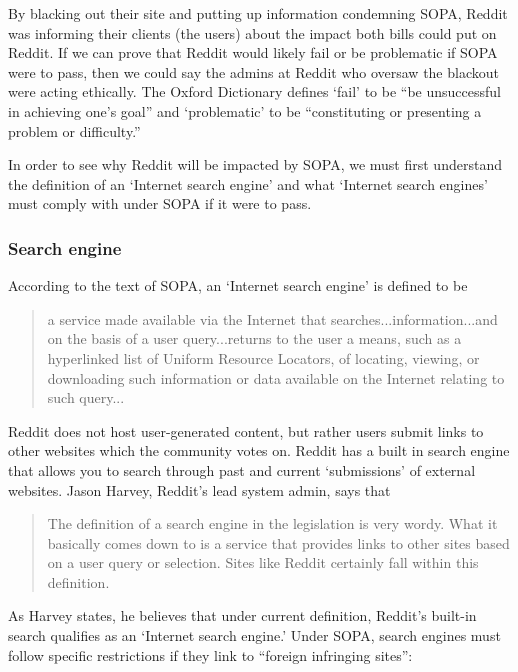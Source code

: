 \documentclass[11pt]{article}
\begin{document}
\begin{multicols}{2}
By blacking out their site and putting up information condemning SOPA, Reddit was informing their clients (the users) about the impact both bills could put on Reddit. If we can prove that Reddit would likely fail or be problematic if SOPA were to pass, then we could say the admins at Reddit who oversaw the blackout were acting ethically. The Oxford Dictionary defines `fail' to be ``be unsuccessful in achieving one’s goal'' and `problematic' to be ``constituting or presenting a problem or difficulty.''\cite{def-fail}\cite{def-problematic}

In order to see why Reddit will be impacted by SOPA, we must first understand the definition of an `Internet search engine' and what `Internet search engines' must comply with under SOPA if it were to pass.

   \subsubsection{Search engine}

According to the text of SOPA, an `Internet search engine' is defined to be

\begin{quote}a service made available via the Internet that searches...information...and on the basis of a user query...returns to the user a means, such as a hyperlinked list of Uniform Resource Locators, of locating, viewing, or downloading such information or data available on the Internet relating to such query...\cite[101.16]{sopa}\end{quote}

Reddit does not host user-generated content, but rather users submit links to other websites which the community votes on.\cite{reddit-help-voting} Reddit has a built in search engine that allows you to search through past and current `submissions' of external websites. Jason Harvey, Reddit's lead system admin,\cite{reddit-faqs-jobs} says that

\begin{quote}The definition of a search engine in the legislation is very wordy. What it basically comes down to is a service that provides links to other sites based on a user query or selection. Sites like Reddit certainly fall within this definition.\cite{reddit-sopapipa-explaination}\end{quote}

As Harvey states, he believes that under current definition, Reddit's built-in search qualifies as an `Internet search engine.' Under SOPA, search engines must follow specific restrictions if they link to ``foreign infringing sites'':


\end{multicols}
\end{document}
